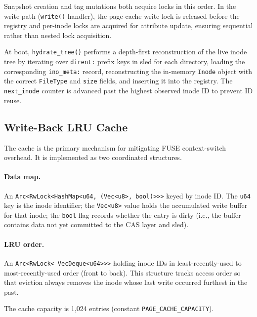 \documentclass[5p,times]{elsarticle}
\begin{document}
Snapshot creation and tag mutations both acquire locks in this order.
In the write path (\texttt{write()} handler), the page-cache write lock
is released before the registry and per-inode locks are acquired for
attribute update, ensuring sequential rather than nested lock acquisition.

At boot, \texttt{hydrate\_tree()} performs a depth-first reconstruction
of the live inode tree by iterating over \texttt{dirent:} prefix keys
in sled for each directory, loading the corresponding \texttt{ino\_meta:}
record, reconstructing the in-memory \texttt{Inode} object with the
correct \texttt{FileType} and \texttt{size} fields, and inserting it into
the registry.  The \texttt{next\_inode} counter is advanced past the
highest observed inode ID to prevent ID reuse.

\subsection{Write-Back LRU Cache}
\label{sec:cache}

The cache is the primary mechanism for mitigating FUSE context-switch
overhead.  It is implemented as two coordinated structures.

\paragraph{Data map.}
An \texttt{Arc\textless{}RwLock\textless{}HashMap\textless{}u64,\allowbreak
(Vec\textless{}u8\textgreater{},\,bool)\textgreater{}\textgreater{}\textgreater{}}
keyed by inode ID.  The \texttt{u64} key is the inode identifier;
the \texttt{Vec\textless{}u8\textgreater{}} value holds the accumulated
write buffer for that inode; the \texttt{bool} flag records whether the
entry is dirty (i.e., the buffer contains data not yet committed to the
CAS layer and sled).

\paragraph{LRU order.}
An \texttt{Arc\textless{}\allowbreak{}RwLock\textless{}\allowbreak{}%
VecDeque\textless{}u64\textgreater{}\textgreater{}\textgreater{}}
holding inode IDs in least-recently-used to most-recently-used order
(front to back). This structure tracks access order so that eviction
always removes the inode whose last write occurred furthest in the past.

The cache capacity is 1,024 entries (constant \texttt{PAGE\_CACHE\_CAPACITY}).
\end{document}

